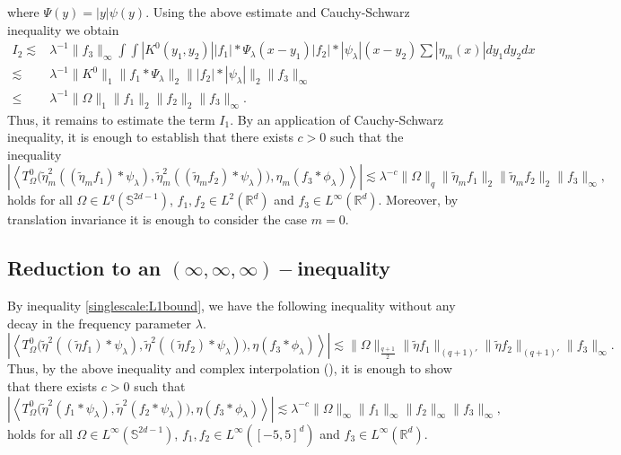 \documentclass[a4paper,reqno]{amsart}
\newcommand{\R}{{\mathbb R}}       %
\newcommand{\Sp}{{\mathbb S}}
\theoremstyle{definition}
\numberwithin{equation}{section}
\begin{document}
where $\Psi(y)=|y|\psi(y)$.
Using the above estimate and Cauchy-Schwarz inequality we obtain
\begin{align*}
	I_2\lesssim&\lambda^{-1}\|f_3\|_\infty\int\int|K^0(y_1,y_2)||f_1|*\Psi_\lambda(x-y_1)|f_2|*|\psi_\lambda|(x-y_2)\sum|\eta_m(x)|dy_1dy_2dx\\
	\lesssim&\lambda^{-1}\|K^0\|_1\|f_1*\Psi_\lambda\|_2\||f_2|*|\psi_\lambda|\|_2\|f_3\|_\infty\\
	\leq&\lambda^{-1}\|\Omega\|_1\|f_1\|_2\|f_2\|_2\|f_3\|_\infty.
\end{align*}
Thus, it remains to estimate the term $I_1$. By an application of Cauchy-Schwarz inequality, it is enough to establish that there exists $c>0$ such that the inequality
\[\left|\left\langle T^0_\Omega\Big(\widetilde\eta_m^2((\widetilde\eta_mf_1)*\psi_\lambda),\widetilde\eta_m^2((\widetilde\eta_mf_2)*\psi_\lambda)\Big),\eta_m(f_3*\phi_{\lambda})\right\rangle\right|\lesssim\lambda^{-c}\|\Omega\|_q\|\widetilde\eta_m f_1\|_2\|\widetilde\eta_m f_2\|_2\|f_3\|_\infty,\]
holds for all $\Omega\in L^q(\Sp^{2d-1})$, $f_1,f_2\in L^2(\R^d)$ and $f_3\in L^\infty(\R^d)$. Moreover, by translation invariance it is enough to consider the case $m=0$.
\subsection{Reduction to an $(\infty,\infty,\infty)-$inequality}
\sloppy By inequality \eqref{singlescale:L1bound}, we have the following inequality without any decay in the frequency parameter $\lambda$.
\begin{equation}\label{est:singlescale1}
	\left|\left\langle T^0_\Omega\Big(\widetilde\eta^2((\widetilde\eta f_1)*\psi_\lambda),\widetilde\eta^2((\widetilde\eta f_2)*\psi_\lambda)\Big),\eta(f_3*\phi_{\lambda})\right\rangle\right|\lesssim\|\Omega\|_{\frac{q+1}{2}}\|\widetilde\eta f_1\|_{(q+1)'}\|\widetilde\eta f_2\|_{(q+1)'}\|f_3\|_\infty.
\end{equation}
Thus, by the above inequality and complex interpolation (), it is enough to show that there exists $c>0$ such that
\begin{equation}\label{est:infty^4}
	\left|\left\langle T^0_\Omega\Big(\widetilde\eta^2(f_1*\psi_\lambda),\widetilde\eta^2(f_2*\psi_\lambda)\Big),\eta(f_3*\phi_{\lambda})\right\rangle\right|\lesssim\lambda^{-c}\|\Omega\|_\infty\|f_1\|_{\infty}\|f_2\|_{\infty}\|f_3\|_\infty,
\end{equation}
holds for all $\Omega\in L^\infty(\Sp^{2d-1})$, $f_1,f_2\in L^\infty([-5,5]^d)$ and $f_3\in L^\infty(\R^d)$.
\end{document}

